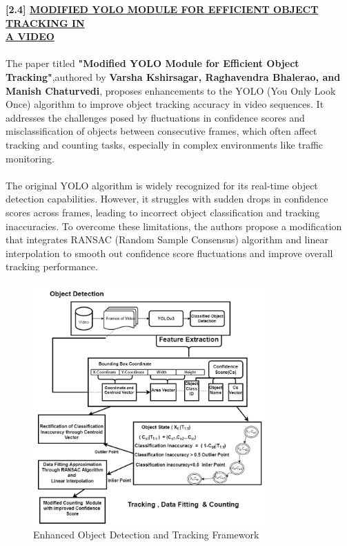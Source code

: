 {\begin{figure}[h!]
\end{figure}
%
%
\newpage
\noindent
{\textbf{[2.4] \underline{MODIFIED YOLO MODULE FOR EFFICIENT OBJECT TRACKING IN} \\ \underline{A VIDEO}}}\\\\
%
The paper titled \textbf{"Modified YOLO Module for Efficient Object Tracking"},authored by \textbf{Varsha Kshirsagar, Raghavendra Bhalerao, and Manish Chaturvedi}, proposes enhancements to the YOLO (You Only Look Once) algorithm to improve object tracking accuracy in video sequences. It addresses the challenges posed by fluctuations in confidence scores and misclassification of objects between consecutive frames, which often affect tracking and counting tasks, especially in complex environments like traffic monitoring.\\\\
%
The original YOLO algorithm is widely recognized for its real-time object detection capabilities. However, it struggles with sudden drops in confidence scores across frames, leading to incorrect object classification and tracking inaccuracies. To overcome these limitations, the authors propose a modification that integrates RANSAC (Random Sample Consensus) algorithm and linear interpolation to smooth out confidence score fluctuations and improve overall tracking performance.
%
%
\begin{figure}[h!]
    \centering
    \includegraphics[width=0.8\textwidth]{images/Paper 4 Architecture.png}
    \caption{Enhanced Object Detection and Tracking Framework}

\end{figure}}
